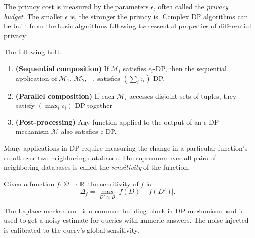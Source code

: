 

The privacy cost is measured by the parameters $\epsilon$, often called the \emph{privacy budget}. The smaller $\epsilon$ is, the stronger the privacy is.  
Complex DP algorithms can be built from the basic algorithms following two essential properties of differential privacy:

\begin{proposition}\label{prop:DP-comp-post} 
    The following hold.
    \begin{enumerate}
        \item {\bf (Sequential composition)} 
        If $\mathcal{M}_i$ satisfies $\epsilon_i$-DP, then the sequential application of $\mathcal{M}_1$, $\mathcal{M}_2, \cdots$,  satisfies $(\sum_{i} \epsilon_i)$-DP.
        
        \item {\bf (Parallel composition)} 
        If each $\mathcal{M}_i$ accesses disjoint sets of tuples, they satisfy $(\max_i \epsilon_i)$-DP together.
        
        \item {\bf (Post-processing)} 
        Any function applied to the output of an $\epsilon$-DP mechanism $\mathcal{M}$ also satisfies $\epsilon$-DP.
    \end{enumerate}
\end{proposition}



Many applications in DP require measuring the change in a particular function's result over two neighboring databases. The supremum over all pairs of neighboring databases is called the \emph{sensitivity} of the function. 

\begin{definition}\label{def:sensitivity}
Given a function $f: \mathcal{D} \rightarrow \mathbb{R}$,  the  sensitivity of $f$ is 
\begin{equation}
\Delta_f = \max\limits_{D'\approx D}|f(D) - f(D')|.
\end{equation}
\end{definition}


The Laplace mechanism~\cite{DworkMNS16} is a common building block in DP mechanisms and is used to get a noisy estimate for queries with numeric answers. The noise injected is calibrated to the query's global sensitivity.

